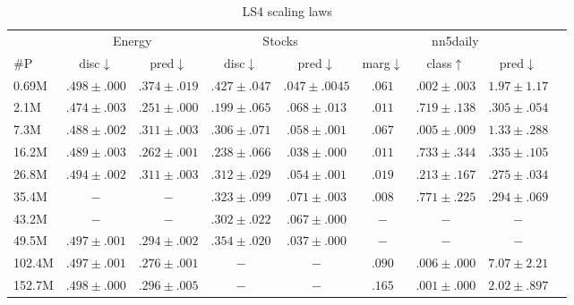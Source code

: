 \documentclass{article}
\begin{document}
\begin{table}[!ht]
    \centering
    \caption{LS4 scaling laws}
    \setlength{\tabcolsep}{3.8pt}
    \label{tab:ls4_scaling_laws}
    \begin{tabular}{l|c|c|c|c|c|c|c|c}
        \toprule
        & \multicolumn{2}{c|}{Energy} & \multicolumn{2}{c|}{Stocks} & \multicolumn{3}{c|}{nn5daily} \\
        $\#$P & disc$\downarrow$ & pred$\downarrow$ & disc$\downarrow$ & pred$\downarrow$ & marg$\downarrow$ & class$\uparrow$ & pred$\downarrow$ \\
        \midrule
        0.69M  & $ .498 \pm .000$ & $ .374 \pm .019$ & $ .427 \pm .047$ & $ .047 \pm .0045$ & $.061$ & $ .002 \pm .003$  & $ 1.97 \pm 1.17$ \\
        2.1M   & $ .474 \pm .003$ & $ .251 \pm .000$ & $ .199 \pm .065$ & $ .068 \pm .013$ & $.011$ & $ .719 \pm .138$  & $ .305 \pm .054$ \\
        7.3M   & $ .488 \pm .002$ & $ .311 \pm .003$ & $ .306 \pm .071$ & $ .058 \pm .001$ & $ .067 $ & $ .005 \pm .009 $ & $ 1.33 \pm .288 $ \\
        16.2M  & $ .489 \pm .003$ & $ .262 \pm .001$ & $ .238 \pm .066$ & $ .038 \pm .000$ & $.011$ & $ .733 \pm .344$  & $ .335 \pm .105$ \\
        26.8M  & $ .494 \pm .002$ & $ .311 \pm .003$ & $ .312 \pm .029$ & $ .054 \pm .001$ & $.019$ & $ .213 \pm .167$  & $ .275 \pm .034$ \\
        35.4M  & $ - $  & $ - $ & $ .323 \pm .099$ & $ .071 \pm .003$ & $.008$ & $ .771 \pm .225$  & $ .294 \pm .069$ \\
        43.2M  & $ - $  & $ - $ & $ .302 \pm .022$ & $ .067 \pm .000$ & $ - $ & $ - $  & $ - $ \\
        49.5M  & $ .497 \pm .001$ & $ .294 \pm .002$ & $ .354 \pm .020$ & $ .037 \pm .000$ & $ - $ & $ - $  & $ - $ \\
        102.4M & $ .497 \pm .001$ & $ .276 \pm .001$ & $ - $            & $ - $            & $.090$ & $ .006 \pm .000$  & $ 7.07 \pm 2.21$ \\
        152.7M & $ .498 \pm .000$ & $ .296 \pm .005$ & $ - $ & $ - $ & $.165$ & $ .001 \pm .000$  & $ 2.02 \pm .897$ \\
        \bottomrule
    \end{tabular}
\end{table}
\end{document}
